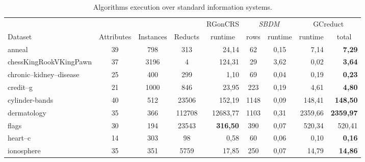 \documentclass[authoryear,preprint,review,12pt]{elsarticle}
\begin{document}
	\begin{table}[!htb]
		\setlength{\tabcolsep}{3pt}
		\caption{Algorithms execution over standard information systems.}\label{tab:matlab}
		\centering \scriptsize
		\begin{tabular}{|l|c|c|c|r|c|c|r|r|}
			\hline
			&&&& RGonCRS & \multicolumn{2}{c|}{\textit{SBDM}} & \multicolumn{2}{c|}{GCreduct}\\ %
			\cline{6-9}
			Dataset & Attributes & Instances & Reducts & \multicolumn{1}{c|}{runtime} & rows & runtime & \multicolumn{1}{c|}{runtime} & \multicolumn{1}{c|}{total} \\ %
			\hline
			anneal	& 39 & 798 & 313 & 24,14 & 62 & 0,15 & 7,14 & \textbf{7,29} \\ %
			chessKingRookVKingPawn & 37 & 3196 & 4 & 124,31 & 29 & 3,62 & 0,02 & \textbf{3,64}\\ %
			chronic--kidney--disease & 25 & 400 & 299 & 1,10 & 69 & 0,04 & 0,19 & \textbf{0,23} \\ %
			credit--g & 21 & 1000 & 846 & 23,95 & 223 & 0,19 & 4,61 & \textbf{4,80} \\ %
			cylinder-bands & 40 & 512 & 23506 & 152,19 & 1148 & 0,09 & 148,41 & \textbf{148,50}\\ %
			dermatology & 35 & 366 & 112708 & 12683,77 & 1103 & 0,31 & 2359,66 & \textbf{2359,97} \\ %
			flags & 30 & 194 & 23543 & \textbf{316,50} & 390 & 0,07 & 520,34 & 520,41 \\ %
			heart--c & 14 & 303 & 98 & 0,58 & 60 & 0,06 & 0,10 & \textbf{0,16}\\ %
			ionosphere & 35 & 351 & 5759 & 17,85 & 250 & 0,07 & 14,79 & \textbf{14,86}\\ %

\end{tabular}
\end{table}
\end{document}
